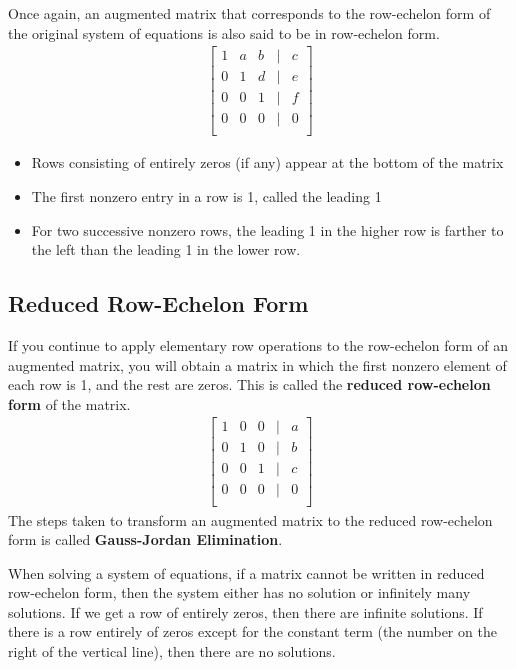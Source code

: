 \documentclass[11pt]{article}
\begin{document}
Once again, an augmented matrix that corresponds to the row-echelon form of the original system of equations is also said to be in row-echelon form.
\begin{align*}
    \begin{bmatrix}
        1 & a & b & | & c \\
        0 & 1 & d & | & e \\
        0 & 0 & 1 & | & f \\
        0 & 0 & 0 & | & 0 \\
    \end{bmatrix}
\end{align*}
\begin{itemize}
    \item Rows consisting of entirely zeros (if any) appear at the bottom of the matrix
    \item The first nonzero entry in a row is 1, called the leading 1
    \item For two successive nonzero rows, the leading 1 in the higher row is farther to the left than the leading 1 in the lower row.
\end{itemize}

\subsection{Reduced Row-Echelon Form}

If you continue to apply elementary row operations to the row-echelon form of an augmented matrix, you will obtain a matrix in which the first nonzero element of each row is 1, and the rest are zeros. This is called the \textbf{reduced row-echelon form} of the matrix.
\begin{align*}
    \begin{bmatrix}
        1 & 0 & 0 & | & a \\
        0 & 1 & 0 & | & b \\
        0 & 0 & 1 & | & c \\
        0 & 0 & 0 & | & 0 \\    
    \end{bmatrix}
\end{align*}
The steps taken to transform an augmented matrix to the reduced row-echelon form is called \textbf{Gauss-Jordan Elimination}.

When solving a system of equations, if a matrix cannot be written in reduced row-echelon form, then the system either has no solution or infinitely many solutions. If we get a row of entirely zeros, then there are infinite solutions. If there is a row entirely of zeros except for the constant term (the number on the right of the vertical line), then there are no solutions.
\end{document}

